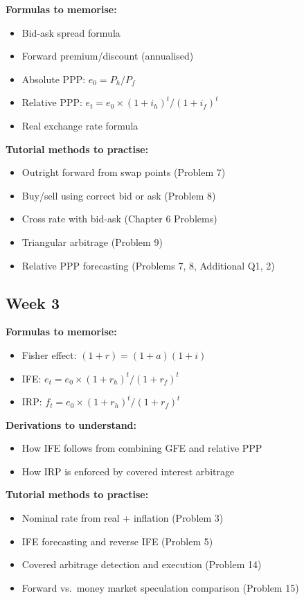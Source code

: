 \documentclass[11pt,a4paper]{article}
\newcommand{\cb}{\(\square\)\enspace}
\begin{document}
\textbf{Formulas to memorise:}
\begin{itemize}[leftmargin=2em]
  \item[\cb] Bid-ask spread formula
  \item[\cb] Forward premium/discount (annualised)
  \item[\cb] Absolute PPP: $e_0 = P_h/P_f$
  \item[\cb] Relative PPP: $e_t = e_0 \times (1+i_h)^t/(1+i_f)^t$
  \item[\cb] Real exchange rate formula
\end{itemize}

\textbf{Tutorial methods to practise:}
\begin{itemize}[leftmargin=2em]
  \item[\cb] Outright forward from swap points (Problem 7)
  \item[\cb] Buy/sell using correct bid or ask (Problem 8)
  \item[\cb] Cross rate with bid-ask (Chapter 6 Problems)
  \item[\cb] Triangular arbitrage (Problem 9)
  \item[\cb] Relative PPP forecasting (Problems 7, 8, Additional Q1, 2)
\end{itemize}

\subsection*{Week 3}

\textbf{Formulas to memorise:}
\begin{itemize}[leftmargin=2em]
  \item[\cb] Fisher effect: $(1+r) = (1+a)(1+i)$
  \item[\cb] IFE: $e_t = e_0 \times (1+r_h)^t/(1+r_f)^t$
  \item[\cb] IRP: $f_t = e_0 \times (1+r_h)^t/(1+r_f)^t$
\end{itemize}

\textbf{Derivations to understand:}
\begin{itemize}[leftmargin=2em]
  \item[\cb] How IFE follows from combining GFE and relative PPP
  \item[\cb] How IRP is enforced by covered interest arbitrage
\end{itemize}

\textbf{Tutorial methods to practise:}
\begin{itemize}[leftmargin=2em]
  \item[\cb] Nominal rate from real + inflation (Problem 3)
  \item[\cb] IFE forecasting and reverse IFE (Problem 5)
  \item[\cb] Covered arbitrage detection and execution (Problem 14)
  \item[\cb] Forward vs.\ money market speculation comparison (Problem 15)
\end{itemize}
\end{document}
